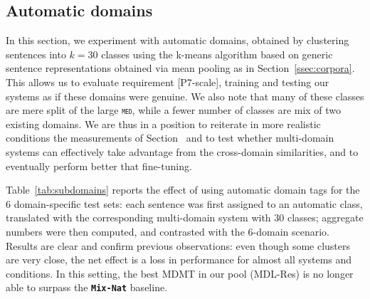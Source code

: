 \documentclass[11pt,a4paper]{article}
\newcommand{\fyTodo}[1]{\Todo[FY:]{\textcolor{orange}{#1}}}
\newcommand{\fyDone}[1]{\done[FY]\Todo[FY:]{\textcolor{orange}{#1}}}
\newcommand{\domain}[1]{\texttt{\textsc{#1}}}
\newcommand{\system}[1]{\texttt{\textbf{#1}}}
\begin{document}

\subsection{Automatic domains \label{ssec:autodomains}}
In this section, we experiment with automatic domains, obtained by clustering sentences into $k=30$ classes using the k-means algorithm based on generic sentence representations obtained via mean pooling as in Section~\ref{ssec:corpora}. This allows us to evaluate requirement [P7-scale], training and testing our systems as if these domains were genuine. We also note that many of these classes are mere split of the large \domain{med}, while a fewer number of classes are mix of two existing domains. We are thus in a position to reiterate in more realistic conditions the measurements of Section~\label{ssec:} and to test whether multi-domain systems can effectively take advantage from the cross-domain similarities, and to eventually perform better that fine-tuning.

Table~\ref{tab:subdomains} reports the effect of using automatic domain tags for the 6 domain-specific test sets: each sentence was first assigned to an automatic class, translated with the corresponding multi-domain system with 30 classes; aggregate numbers were then computed, and contrasted with the 6-domain scenario. Results are clear and confirm previous observations: even though some clusters are very close, the net effect is a loss in performance for almost all systems and conditions. In this setting, the best MDMT in our pool (MDL-Res) is no longer able to surpass the \system{Mix-Nat} baseline.%
\end{document}
